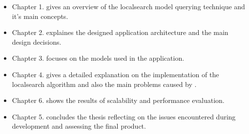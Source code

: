 \begin{itemize}
  \item Chapter 1. gives an overview of the localsearch model querying technique
  and it's main concepts.
  \item Chapter 2. explaines the designed application architecture and the main
  design decisions.
  \item Chapter 3. focuses on the models used in the application.
  \item Chapter 4. gives a detailed explanation on the implementation of the
  localsearch algorithm and also the main problems caused by \CPP{}.
  \item Chapter 6. shows the results of scalability and performance evaluation.
  \item Chapter 5. concludes the thesis reflecting on the issues encountered
  during development and assessing the final product.
\end{itemize}
